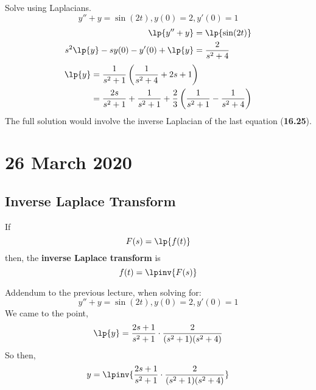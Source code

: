 \documentclass[twoside]{report}
\begin{document}
    \np
    \begin{example}
        Solve using Laplacians.
        \begin{equation}
            y'' + y = \sin(2t), y(0) = 2, y'(0) = 1
        \end{equation}
        \begin{alignat}{1}
            \lp{y'' + y} &= \lp{\sin(2t)}\\
            s^2\lp{y}-sy(0)-y'(0)+\lp{y} &= \frac{2}{s^{2} + 4}
        \end{alignat}
        \begin{alignat}{1}
            \lp{y} &= \frac{1}{s^{2} + 1}\left(\frac{1}{s^2 + 4} + 2s + 1\right)\\
            &= \frac{2s}{s^{2} + 1} + \frac{1}{s^{2} + 1} + \frac{2}{3}\left(\frac{1}{s^{2} + 1} - \frac{1}{s^{2} + 4}\right)
        \end{alignat}
        The full solution would involve the inverse Laplacian of the last equation (\textbf{16.25}).
    \end{example}
    \chapter{26 March 2020}
    \section{Inverse Laplace Transform}
    \begin{definition}
        If
        \begin{equation}
            F(s) = \lp{f(t)}
        \end{equation}
        then, the \textbf{inverse Laplace transform} is
        \begin{equation}
            f(t) = \lpinv{F(s)}
        \end{equation}
    \end{definition}
    Addendum to the previous lecture, when solving for:
    \begin{equation}
        y'' + y = \sin(2t), y(0) = 2, y'(0) = 1
    \end{equation}
    We came to the point,
    \begin{equation}
        \lp{y} = \frac{2s + 1}{s^{2} + 1}\cdot\frac{2}{(s^{2} + 1)(s^{2} + 4)}
    \end{equation}
    So then,
    \begin{equation}
        y = \lpinv{\frac{2s + 1}{s^{2} + 1}\cdot\frac{2}{(s^{2} + 1)(s^{2} + 4)}}
    \end{equation}
\end{document}
